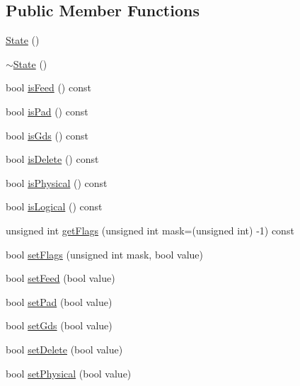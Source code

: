 \subsection*{Public Member Functions}
\begin{DoxyCompactItemize}
\item 
\mbox{\hyperlink{classCRL_1_1Catalog_1_1State_a97e69ca85c09942e20d41013b8ff5280}{State}} ()
\item 
\mbox{\hyperlink{classCRL_1_1Catalog_1_1State_ae25003eae8262a994fba979f28c35aed}{$\sim$\+State}} ()
\item 
bool \mbox{\hyperlink{classCRL_1_1Catalog_1_1State_a53c89121d49a7fc9f8a09093a35d32c4}{is\+Feed}} () const
\item 
bool \mbox{\hyperlink{classCRL_1_1Catalog_1_1State_a457e8dcf1928e6df40ec9f686350c2d0}{is\+Pad}} () const
\item 
bool \mbox{\hyperlink{classCRL_1_1Catalog_1_1State_a7af8d732bf9cea0b0ddb4eca3b0528ec}{is\+Gds}} () const
\item 
bool \mbox{\hyperlink{classCRL_1_1Catalog_1_1State_ac6df038ecb133b973f9b9f2a5e858ca5}{is\+Delete}} () const
\item 
bool \mbox{\hyperlink{classCRL_1_1Catalog_1_1State_a72b60d86f25221fd8fe7a5902be528a2}{is\+Physical}} () const
\item 
bool \mbox{\hyperlink{classCRL_1_1Catalog_1_1State_a07aad28830a57090cf9203b0ff8714b1}{is\+Logical}} () const
\item 
unsigned int \mbox{\hyperlink{classCRL_1_1Catalog_1_1State_a80ac3efddd043ec7151680755cc3db42}{get\+Flags}} (unsigned int mask=(unsigned int) -\/1) const
\item 
bool \mbox{\hyperlink{classCRL_1_1Catalog_1_1State_a73a3866e9da359611638b2d725a79613}{set\+Flags}} (unsigned int mask, bool value)
\item 
bool \mbox{\hyperlink{classCRL_1_1Catalog_1_1State_ab5936e80369947177be88c3d770f4725}{set\+Feed}} (bool value)
\item 
bool \mbox{\hyperlink{classCRL_1_1Catalog_1_1State_a97e2158809ed0e88237bb92eb8daa290}{set\+Pad}} (bool value)
\item 
bool \mbox{\hyperlink{classCRL_1_1Catalog_1_1State_acc0c819f382393dc780bb19c7788b216}{set\+Gds}} (bool value)
\item 
bool \mbox{\hyperlink{classCRL_1_1Catalog_1_1State_a53873a1a42083389dfae02b46b3f2de3}{set\+Delete}} (bool value)
\item 
bool \mbox{\hyperlink{classCRL_1_1Catalog_1_1State_a85a091727c8e7de2b16d01088324de0d}{set\+Physical}} (bool value)

\end{DoxyCompactItemize}
